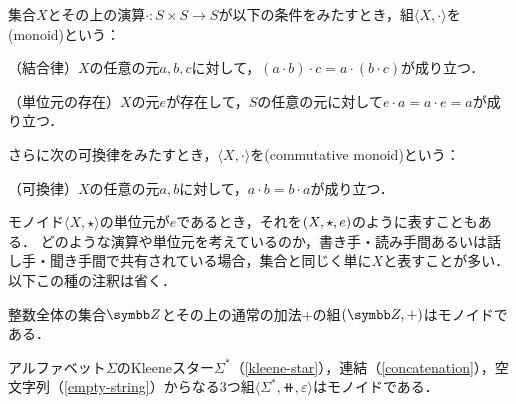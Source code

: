 \documentclass[../main.tex]{subfiles}
\begin{document}
\begin{thmbox}
\begin{definition} 集合\(X\)とその上の演算\(\mathord{\cdot}\colon S \times S \to S\)が以下の条件をみたすとき，組\(\langle X, \mathord{\cdot} \rangle\)を(monoid)という：
\begin{conditions}
    \item （結合律）\(X\)の任意の元\(a, b, c\)に対して，\((a \cdot b) \cdot c = a \cdot (b \cdot c)\)が成り立つ．
    \item （単位元の存在）\(X\)の元\(e\)が存在して，\(S\)の任意の元に対して\(e \cdot a = a \cdot e = a\)が成り立つ．
\end{conditions}
さらに次の可換律をみたすとき，\(\langle X, \mathord{\cdot} \rangle\)を(commutative monoid)という：
\begin{conditions}[resume]
    \item （可換律）\(X\)の任意の元\(a, b\)に対して，\(a \cdot b = b \cdot a\)が成り立つ．
\end{conditions}
\end{definition}
\end{thmbox}

モノイド\(\langle X, \mathord{\star} \rangle\)の単位元が\(e\)であるとき，それを\(( X, \mathord{\star}, e )\)のように表すこともある．
どのような演算や単位元を考えているのか，書き手・読み手間あるいは話し手・聞き手間で共有されている場合，集合と同じく単に\(X\)と表すことが多い．以下この種の注釈は省く．

\begin{exa} 整数全体の集合\(\Integer\)とその上の通常の加法\(\mathord{+}\)の組\(\tuple{\Integer, \mathord{+} }\)はモノイドである．
\end{exa}

\begin{exa} アルファベット\(\Sigma\)のKleeneスター\(\Sigma^{\mathord{*}}\)（\eqref{kleene-star}），連結（\eqref{concatenation}），空文字列（\eqref{empty-string}）からなる3つ組\(\langle \Sigma^{\mathord{*}}, \doubleplus, \varepsilon \rangle\)はモノイドである．
\end{exa}
\end{document}
